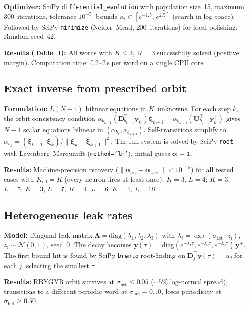\documentclass[12pt]{article}
\newcommand{\vv}[1]{\mathbf{#1}}
\newcommand{\DD}{\vv{D}}
\newcommand{\yy}{\vv{y}}
\newcommand{\xxi}{\boldsymbol{\xi}}
\begin{document}
\textbf{Optimizer:} SciPy \texttt{differential\_evolution} with population size~15, maximum 300~iterations, tolerance $10^{-5}$, bounds $\alpha_i\in[e^{-1.5},\,e^{2.5}]$ (search in log-space). Followed by SciPy \texttt{minimize} (Nelder--Mead, 200~iterations) for local polishing. Random seed~42.

\textbf{Results (Table~1):} All words with $K\leq 3$, $N=3$ successfully solved (positive margin). Computation time: 0.2--2\,s per word on a single CPU core.

\subsection{Exact inverse from prescribed orbit}\label{app:exact-inverse}

\textbf{Formulation:} $L(N{-}1)$ bilinear equations in $K$~unknowns. For each step $k$, the orbit consistency condition $\alpha_{b_{k+1}}(\DD_{b_{k+1}}^\top\yy_k^+)\xxi_{k+1} = \alpha_{b_{k+1}}(\vv{U}_{b_{k+1}}^\top\yy_k^+)$ gives $N{-}1$ scalar equations bilinear in $(\alpha_{b_k},\alpha_{b_{k+1}})$. Self-transitions simplify to $\alpha_{b_k}=(\xxi_{k+1}\cdot\xxi_k)/\|\xxi_k-\xxi_{k+1}\|^2$. The full system is solved by SciPy \texttt{root} with Levenberg--Marquardt (\texttt{method='lm'}), initial guess $\boldsymbol{\alpha}=\vv{1}$.

\textbf{Results:} Machine-precision recovery ($\|\boldsymbol{\alpha}_{\text{rec}}-\boldsymbol{\alpha}_{\text{true}}\|<10^{-15}$) for all tested cases with $K_{\text{eff}}=K$ (every neuron fires at least once): $K=3$, $L=4$; $K=3$, $L=5$; $K=3$, $L=7$; $K=4$, $L=6$; $K=4$, $L=18$.

\subsection{Heterogeneous leak rates}\label{app:het-leak}

\textbf{Model:} Diagonal leak matrix $\boldsymbol{\Lambda}=\text{diag}(\lambda_1,\lambda_2,\lambda_3)$ with $\lambda_i=\exp(\sigma_{\text{het}}\cdot z_i)$, $z_i\sim\mathcal{N}(0,1)$, seed~0. The decay becomes $\yy(\tau)=\text{diag}(e^{-\lambda_1\tau},e^{-\lambda_2\tau},e^{-\lambda_3\tau})\,\yy^+$. The first bound hit is found by SciPy \texttt{brentq} root-finding on $\DD_j^\top\yy(\tau)=\alpha_j$ for each $j$, selecting the smallest $\tau$.

\textbf{Results:} RBYGYB orbit survives at $\sigma_{\text{het}}\leq 0.05$ (${\sim}5\%$ log-normal spread), transitions to a different periodic word at $\sigma_{\text{het}}=0.10$, loses periodicity at $\sigma_{\text{het}}\geq 0.50$.
\end{document}
